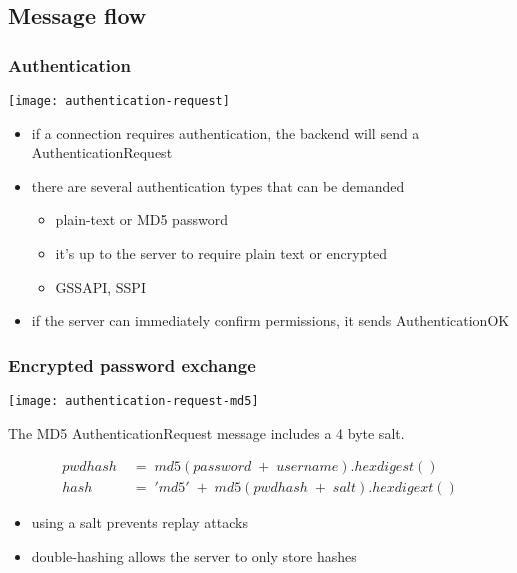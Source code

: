 \documentclass{beamer}
\begin{document}
\subsection{Message flow}

\begin{frame}
  \frametitle{Authentication}

  \begin{center}
    \texttt{[image: authentication-request]}
  \end{center}

  \begin{itemize}
  \item if a connection requires authentication, the backend will send a
    AuthenticationRequest
  \item there are several authentication types that can be demanded
    \begin{itemize}
    \item plain-text or MD5 password
    \item it's up to the server to require plain text or encrypted
    \item GSSAPI, SSPI
    \end{itemize}
  \item if the server can immediately confirm permissions, it sends
    AuthenticationOK
  \end{itemize}
\end{frame}

\begin{frame}
  \frametitle{Encrypted password exchange}

  \begin{center}
    \texttt{[image: authentication-request-md5]}
  \end{center}

  The MD5 AuthenticationRequest message includes a 4 byte salt.

  \begin{align*}
    pwdhash\;&=\;md5(password\;+\;username).hexdigest() \\
    hash\;&=\;'md5'\;+\;md5(pwdhash\;+\;salt).hexdigext()
  \end{align*}

  \begin{itemize}
  \item using a salt prevents replay attacks
  \item double-hashing allows the server to only store hashes
  \end{itemize}
\end{frame}
\end{document}
